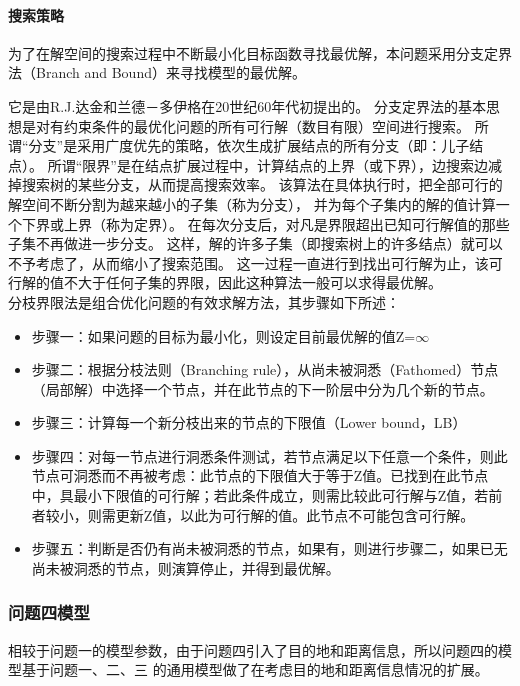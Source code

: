 \documentclass[UTF8，12pt]{ctexart}
\begin{document}
\paragraph{搜索策略}
为了在解空间的搜索过程中不断最小化目标函数寻找最优解，本问题采用分支定界法（Branch and Bound）\cite{bbalgorithm}来寻找模型的最优解。

它是由R.J.达金和兰德－多伊格在20世纪60年代初提出的。
分支定界法的基本思想是对有约束条件的最优化问题的所有可行解（数目有限）空间进行搜索。
所谓“分支”是采用广度优先的策略，依次生成扩展结点的所有分支（即：儿子结点）。
所谓“限界”是在结点扩展过程中，计算结点的上界（或下界），边搜索边减掉搜索树的某些分支，从而提高搜索效率。
该算法在具体执行时，把全部可行的解空间不断分割为越来越小的子集（称为分支），
并为每个子集内的解的值计算一个下界或上界（称为定界）。
在每次分支后，对凡是界限超出已知可行解值的那些子集不再做进一步分支。
这样，解的许多子集（即搜索树上的许多结点）就可以不予考虑了，从而缩小了搜索范围。
这一过程一直进行到找出可行解为止，该可行解的值不大于任何子集的界限，因此这种算法一般可以求得最优解。\\

分枝界限法是组合优化问题的有效求解方法，其步骤如下所述：
\begin{itemize}
		\item 步骤一：如果问题的目标为最小化，则设定目前最优解的值Z=$\infty$
		\item 步骤二：根据分枝法则（Branching rule），从尚未被洞悉（Fathomed）节点（局部解）中选择一个节点，并在此节点的下一阶层中分为几个新的节点。
		\item 步骤三：计算每一个新分枝出来的节点的下限值（Lower bound，LB）
		\item  步骤四：对每一节点进行洞悉条件测试，若节点满足以下任意一个条件，则此节点可洞悉而不再被考虑：此节点的下限值大于等于Z值。已找到在此节点中，具最小下限值的可行解；若此条件成立，则需比较此可行解与Z值，若前者较小，则需更新Z值，以此为可行解的值。此节点不可能包含可行解。
		\item 步骤五：判断是否仍有尚未被洞悉的节点，如果有，则进行步骤二，如果已无尚未被洞悉的节点，则演算停止，并得到最优解。
\end{itemize}


\subsubsection{问题四模型}
	相较于问题一的模型参数，由于问题四引入了目的地和距离信息，所以问题四的模型基于问题一、二、三
	的通用模型做了在考虑目的地和距离信息情况的扩展。\\
	
\end{document}
